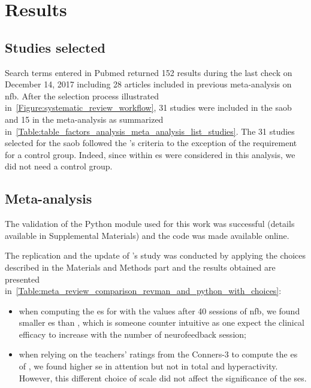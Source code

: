 


\section{Results}

\subsection{Studies selected}

Search terms entered in Pubmed returned 152 results during the last check on December 14, 2017 including 28 articles included in previous
meta-analysis on \gls{nfb}. After the selection process illustrated in~\ref{Figure:systematic_review_workflow}, 
31 studies were included in the \gls{saob} and 15 in the meta-analysis as summarized in~\ref{Table:table_factors_analysis_meta_analysis_list_studies}.
The 31 studies selected for the \gls{saob} followed the \citeauthor{Cortese2016}'s criteria to the exception of the
requirement for a control group. 
Indeed, since within \gls{es} were considered in this analysis, we did not need a control group.

\subsection{Meta-analysis}

The validation of the Python module used for this work was successful (details available in Supplemental Materials) and the code was made
available online\cite{}.

The replication and the update of \citeauthor{Cortese2016}'s study was conducted by applying the choices described in the Materials and Methods part 
and the results obtained are presented in~\ref{Table:meta_review_comparison_revman_and_python_with_choices}:

\begin{itemize}
    \item when computing the \gls{es} for \citet{Arnold2014} with the values after 40 sessions of \gls{nfb}, we found
      smaller \gls{es} than \citet{Cortese2016}, which is someone counter intuitive as one expect the clinical efficacy
      to increase with the number of neurofeedback session;  
    \item when relying on the teachers' ratings from the Conners-3 to compute the \gls{es} of \citet{Steiner2014}, we found higher \gls{se} in attention but not 
      in total and hyperactivity. However, this different choice of scale did not affect the significance of the \glspl{se}.
\end{itemize}

